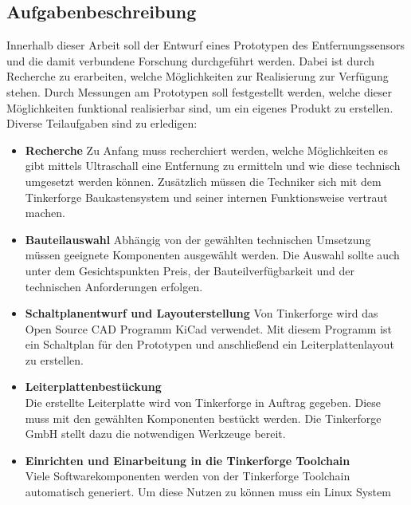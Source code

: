\subsection{Aufgabenbeschreibung}
Innerhalb dieser Arbeit soll der Entwurf eines Prototypen des Entfernungssensors und die damit verbundene Forschung durchgeführt werden. Dabei ist durch Recherche zu erarbeiten, welche Möglichkeiten zur Realisierung zur Verfügung stehen. Durch Messungen am Prototypen soll festgestellt werden, welche dieser Möglichkeiten funktional  realisierbar sind, um ein eigenes Produkt zu erstellen. 
\newline\newline
Diverse Teilaufgaben sind zu erledigen: \newline
\begin{itemize}
\item \textbf{Recherche}\newline
Zu  Anfang  muss  recherchiert  werden,  welche  Möglichkeiten  es  gibt  mittels  Ultraschall eine Entfernung zu ermitteln und wie diese technisch umgesetzt werden können. Zusätzlich müssen die Techniker sich mit dem Tinkerforge Baukastensystem und seiner internen Funktionsweise vertraut machen.
\item \textbf{Bauteilauswahl}\newline
Abhängig  von  der  gewählten  technischen  Umsetzung  müssen  geeignete  Komponenten ausgewählt werden. Die Auswahl sollte auch unter dem Gesichtspunkten Preis, der Bauteilverfügbarkeit und der technischen Anforderungen erfolgen.\\
\item \textbf{Schaltplanentwurf und Layouterstellung}\newline
Von  Tinkerforge  wird  das  Open  Source  CAD  Programm  KiCad  verwendet.  Mit diesem Programm ist ein Schaltplan für den Prototypen und anschließend ein Leiterplattenlayout zu erstellen.
\item \textbf{Leiterplattenbestückung}\\
Die erstellte Leiterplatte wird von Tinkerforge in Auftrag gegeben. Diese muss mit den gewählten Komponenten bestückt werden. Die Tinkerforge GmbH stellt dazu die notwendigen Werkzeuge bereit.
\item \textbf{Einrichten und Einarbeitung in die Tinkerforge Toolchain}\\
Viele  Softwarekomponenten  werden  von  der  Tinkerforge  Toolchain  automatisch generiert. Um diese Nutzen zu können muss ein Linux System %

\end{itemize}
